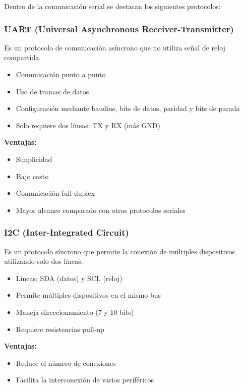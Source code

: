 \documentclass[conference]{IEEEtran}
\begin{document}
Dentro de la comunicación serial se destacan los siguientes protocolos:

\subsubsection{UART (Universal Asynchronous Receiver-Transmitter)}

Es un protocolo de comunicación asíncrono que no utiliza señal de reloj compartida.

\begin{itemize}
    \item Comunicación punto a punto
    \item Uso de tramas de datos
    \item Configuración mediante baudios, bits de datos, paridad y bits de parada
    \item Solo requiere dos líneas: TX y RX (más GND)
\end{itemize}

\textbf{Ventajas:}
\begin{itemize}
    \item Simplicidad
    \item Bajo costo
    \item Comunicación full-duplex
    \item Mayor alcance comparado con otros protocolos seriales
\end{itemize}

\subsubsection{I2C (Inter-Integrated Circuit)}

Es un protocolo síncrono que permite la conexión de múltiples dispositivos utilizando solo dos líneas.

\begin{itemize}
    \item Líneas: SDA (datos) y SCL (reloj)
    \item Permite múltiples dispositivos en el mismo bus
    \item Maneja direccionamiento (7 y 10 bits)
    \item Requiere resistencias pull-up
\end{itemize}

\textbf{Ventajas:}
\begin{itemize}
    \item Reduce el número de conexiones
    \item Facilita la interconexión de varios periféricos
\end{itemize}
\end{document}

